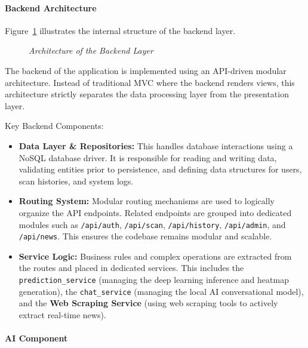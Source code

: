 \paragraph{Backend Architecture}

Figure~\ref{fig:backend_arch} illustrates the internal structure of the backend layer.

\begin{figure}[H]
	\centering
	\caption{\textit{Architecture of the Backend Layer}}
	\label{fig:backend_arch}
\end{figure}

The backend of the application is implemented using an API-driven modular architecture. Instead of traditional MVC where the backend renders views, this architecture strictly separates the data processing layer from the presentation layer.

Key Backend Components:

\begin{itemize}
	\item \textbf{Data Layer \& Repositories:} This handles database interactions using a NoSQL database driver. It is responsible for reading and writing data, validating entities prior to persistence, and defining data structures for users, scan histories, and system logs.
	
	\item \textbf{Routing System:} Modular routing mechanisms are used to logically organize the API endpoints. Related endpoints are grouped into dedicated modules such as \texttt{/api/auth}, \texttt{/api/scan}, \texttt{/api/history}, \texttt{/api/admin}, and \texttt{/api/news}. This ensures the codebase remains modular and scalable.
	
	\item \textbf{Service Logic:} Business rules and complex operations are extracted from the routes and placed in dedicated services. This includes the \texttt{prediction\_service} (managing the deep learning inference and heatmap generation), the \texttt{chat\_service} (managing the local AI conversational model), and the \textbf{Web Scraping Service} (using web scraping tools to actively extract real-time news).
\end{itemize}

\paragraph{AI Component}

